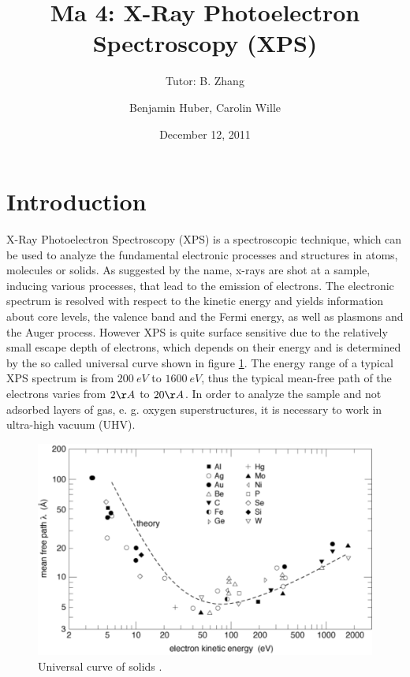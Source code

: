 \documentclass[a4paper]{scrartcl}
\title{Ma 4: X-Ray Photoelectron Spectroscopy (XPS)}
\subtitle{Tutor: B. Zhang}
\author{Benjamin Huber, Carolin Wille}
\date{December 12, 2011}
\numberwithin{equation}{section}
\numberwithin{figure}{section}
\numberwithin{table}{section}
\begin{document}
\thispagestyle{empty}
\maketitle
\tableofcontents
\clearpage


\section{Introduction}
X-Ray Photoelectron Spectroscopy (XPS) is a spectroscopic technique, which can be used to analyze the fundamental electronic processes and structures in atoms, molecules or solids. As suggested by the name, x-rays are shot at a sample, inducing various processes, that lead to the emission of electrons. The electronic spectrum is resolved with respect to the kinetic energy and yields information about core levels, the valence band and the Fermi energy, as well as plasmons and the Auger process. However XPS is quite surface sensitive due to the relatively small escape depth of electrons, which depends on their energy and is determined by the so called universal curve shown in figure \ref{fig:uni}. The energy range of a typical XPS spectrum is from $\SI{200}{eV}$ to $\SI{1600}{eV}$, thus the typical mean-free path of the electrons varies from $2 \AA $ to $20 \AA$. In order to analyze the sample and not adsorbed layers of gas, e. g. oxygen superstructures, it is necessary to work in ultra-high vacuum (UHV).





\begin{figure}
  \centering
   	\includegraphics[width=0.6\linewidth]{img/meanfree.pdf}

 \caption{\small Universal curve of solids \cite{zangwill}.  }
        \label{fig:uni}
\end{figure}
\end{document}
